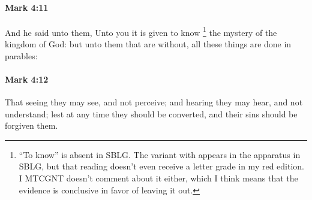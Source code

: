 		\paragraph{Mark 4:11} %
			\label{MARK-4-11}

			And he said unto them, Unto you it is given to know%
				\footnote{%
					``To know'' is absent in SBLG. The variant with  appears in the apparatus in SBLG, but that reading doesn't even receive a letter grade in my red edition. I MTCGNT doesn't comment about it either, which I think means that the evidence is conclusive in favor of leaving it out.
					}
			the mystery of the kingdom of God: but unto them that are without, all these things are done in parables:

			\begin{framed}
			\scriptsize
				\begin{compactdesc}
					\item[SBLG] 
				\end{compactdesc}
			\end{framed}

		\paragraph{Mark 4:12} %
			\label{MARK-4-12}

			That seeing they may see, and not perceive; and hearing they may hear, and not understand; lest at any time they should be converted, and their sins should be forgiven them.

